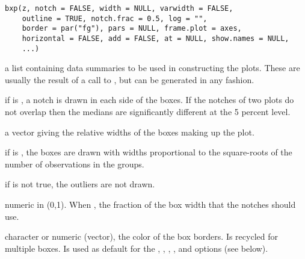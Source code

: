 %
\begin{Usage}
\begin{verbatim}
bxp(z, notch = FALSE, width = NULL, varwidth = FALSE,
    outline = TRUE, notch.frac = 0.5, log = "",
    border = par("fg"), pars = NULL, frame.plot = axes,
    horizontal = FALSE, add = FALSE, at = NULL, show.names = NULL,
    ...)
\end{verbatim}
\end{Usage}
%
\begin{Arguments}
\begin{ldescription}
\item[\code{z}] a list containing data summaries to be used in constructing
the plots.  These are usually the result of a call to
, but can be generated in any fashion.
\item[\code{notch}] if  is , a notch is drawn in each
side of the boxes.  If the notches of two plots do not overlap then
the medians are significantly different at the 5 percent level.
\item[\code{width}] a vector giving the relative widths of the boxes making
up the plot.
\item[\code{varwidth}] if  is , the boxes are drawn
with widths proportional to the square-roots of the number of
observations in the groups.
\item[\code{outline}] if  is not true, the outliers are not
drawn.
\item[\code{notch.frac}] numeric in (0,1). When , the
fraction of the box width that the notches should use.
\item[\code{border}] character or numeric (vector), the color of the box
borders.  Is recycled for multiple boxes.  Is used as default for
the , , , ,
and  options (see below).


\end{ldescription}
\end{Arguments}
